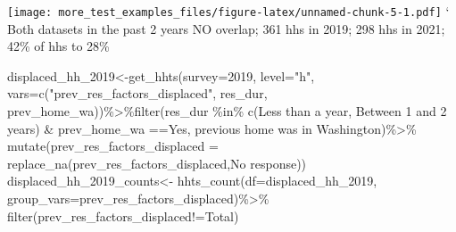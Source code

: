 \documentclass[
]{article}
\newenvironment{Shaded}{\begin{snugshade}}{\end{snugshade}}
\newcommand{\AttributeTok}[1]{\textcolor[rgb]{0.77,0.63,0.00}{#1}}
\newcommand{\FunctionTok}[1]{\textcolor[rgb]{0.00,0.00,0.00}{#1}}
\newcommand{\NormalTok}[1]{#1}
\newcommand{\OtherTok}[1]{\textcolor[rgb]{0.56,0.35,0.01}{#1}}
\newcommand{\SpecialCharTok}[1]{\textcolor[rgb]{0.00,0.00,0.00}{#1}}
\newcommand{\StringTok}[1]{\textcolor[rgb]{0.31,0.60,0.02}{#1}}
\begin{document}
\texttt{[image: more\_test\_examples\_files/figure-latex/unnamed-chunk-5-1.pdf]}
` Both datasets in the past 2 years NO overlap; 361 hhs in 2019; 298 hhs
in 2021; 42\% of hhs to 28\%

\begin{Shaded}
\begin{Highlighting}[]
\NormalTok{displaced\_hh\_2019}\OtherTok{\textless{}{-}}\FunctionTok{get\_hhts}\NormalTok{(}\AttributeTok{survey=}\StringTok{\textquotesingle{}2019\textquotesingle{}}\NormalTok{, }\AttributeTok{level=}\StringTok{"h"}\NormalTok{, }\AttributeTok{vars=}\FunctionTok{c}\NormalTok{(}\StringTok{"prev\_res\_factors\_displaced"}\NormalTok{, }\StringTok{\textquotesingle{}res\_dur\textquotesingle{}}\NormalTok{, }\StringTok{\textquotesingle{}prev\_home\_wa\textquotesingle{}}\NormalTok{))}\SpecialCharTok{\%\textgreater{}\%}\FunctionTok{filter}\NormalTok{(res\_dur }\SpecialCharTok{\%in\%} \FunctionTok{c}\NormalTok{(}\StringTok{\textquotesingle{}Less than a year\textquotesingle{}}\NormalTok{, }\StringTok{\textquotesingle{}    Between 1 and 2 years\textquotesingle{}}\NormalTok{) }\SpecialCharTok{\&}\NormalTok{ prev\_home\_wa }\SpecialCharTok{==}\StringTok{\textquotesingle{}Yes, previous home was in Washington\textquotesingle{}}\NormalTok{)}\SpecialCharTok{\%\textgreater{}\%} \FunctionTok{mutate}\NormalTok{(}\AttributeTok{prev\_res\_factors\_displaced =} \FunctionTok{replace\_na}\NormalTok{(prev\_res\_factors\_displaced,}\StringTok{\textquotesingle{}No response\textquotesingle{}}\NormalTok{))}
\NormalTok{displaced\_hh\_2019\_counts}\OtherTok{\textless{}{-}} \FunctionTok{hhts\_count}\NormalTok{(}\AttributeTok{df=}\NormalTok{displaced\_hh\_2019, }\AttributeTok{group\_vars=}\StringTok{\textquotesingle{}prev\_res\_factors\_displaced\textquotesingle{}}\NormalTok{)}\SpecialCharTok{\%\textgreater{}\%}
\FunctionTok{filter}\NormalTok{(prev\_res\_factors\_displaced}\SpecialCharTok{!=}\StringTok{\textquotesingle{}Total\textquotesingle{}}\NormalTok{)}


\end{Highlighting}
\end{Shaded}
\end{document}
